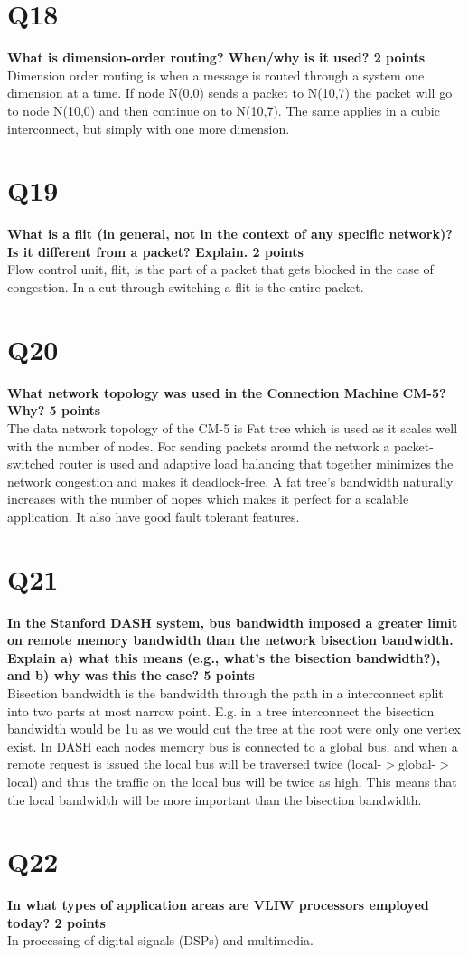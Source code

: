 \documentclass[a4paper]{article}
\begin{document}
\section*{Q18}
\large{\textbf{
What is dimension-order routing? When/why is it used? 2 points\\}}
Dimension order routing is when a message is routed through a system one dimension at a time. If node N(0,0) sends a packet to N(10,7) the packet will go to node N(10,0) and then continue on to N(10,7). The same applies in a cubic interconnect, but simply with one more dimension.  

\section*{Q19}
\large{\textbf{
What is a flit (in general, not in the context of any specific network)? Is it different from a packet? Explain. 2 points\\}}
Flow control unit, flit, is the part of a packet that gets blocked in the case of congestion. In a cut-through switching a flit is the entire packet.

\section*{Q20}
\large{\textbf{What network topology was used in the Connection Machine CM-5? Why? 5 points\\}}
The data network topology of the CM-5 is Fat tree which is used as it scales well with the number of nodes. For sending packets around the network a packet-switched router is used and adaptive load balancing that together minimizes the network congestion and makes it deadlock-free. A fat tree's bandwidth naturally increases with the number of nopes which makes it perfect for a scalable application. It also have good fault tolerant features.

\section*{Q21}
\large{\textbf{
In the Stanford DASH system, bus bandwidth imposed a greater limit on remote memory bandwidth than the network bisection bandwidth. Explain a) what this means (e.g., what’s the bisection bandwidth?), and b) why was this the case? 5 points \\}}
Bisection bandwidth is the bandwidth through the path in a interconnect split into two parts at most narrow point. E.g. in a tree interconnect the bisection bandwidth would be 1u as we would cut the tree at the root were only one vertex exist. In DASH each nodes memory bus is connected to a global bus, and when a remote request is issued the local bus will be traversed twice (local-$>$global-$>$local) and thus the traffic on the local bus will be twice as high. This means that the local bandwidth will be more important than the bisection bandwidth.   

\section*{Q22}
\large{\textbf{In what types of application areas are VLIW processors employed today? 2 points\\}}
In processing of digital signals (DSPs) and multimedia.
\end{document}
